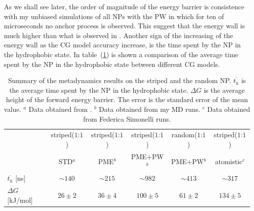 As we shall see later, the order of magnitude of the energy barrier is consistence with my unbiased simulations of all \acp{NP} with the \ac{PW} in which for ten of microseconds no anchor process is observed. This suggest that the energy wall is much higher than what is observed in \cite{ourPaper}. Another sign of the increasing of the energy wall as the \ac{CG} model accuracy increase, is the time spent by the \ac{NP} in the hydrophobic state. In table~(\ref{tab:hydroTime}) is shown a comparison of the average time spent by the \ac{NP} in the hydrophobic state between different \ac{CG} models.
\begin{table}[h!t]
	\centering\footnotesize
	\begin{tabular}{lccccc}
		\toprule
		\,	& striped($1$:$1$)	& striped($1$:$1$)	& striped($1$:$1$)	& random($1$:$1$)	& striped($1$:$1$) 	\\
		\,	& STD$^a$	& \acs{PME}$^b$	& \acs{PME}$+$\acs{PW}$^b$	& \acs{PME}$+$\acs{PW}$^b$ 	& atomistic$^c$		\\ \toprule
	$\overline{t_{h}}$ [ns]	& $\sim 140$& $\sim 215$	& $\sim 982$	& $\sim 413$ 	& $\sim 317$		\\ \midrule
	$\Delta G$ [kJ/mol] 	& $26 \pm 2$& $36 \pm 4$	& $100 \pm 5$	& $61 \pm 2$ 	& $134 \pm 5$		\\ \bottomrule
	\end{tabular}
	\caption{Summary of the metadynamics results on the striped and the random \acs{NP}. $\overline{t_h}$ is the average time spent by the \acs{NP} in the hydrophobic state. $\Delta G$ is the average height of the forward energy barrier. The error is the standard error of the mean value. $^a$ Data obtained from \cite{ourPaper}. $^b$ Data obtained from my \acs{MD} runs. $^c$ Data obtained from Federica Simonelli runs.}
	\label{tab:hydroTime}
\end{table}

